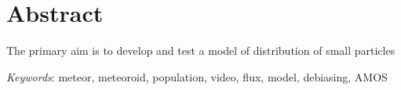 \section*{Abstract}
    The primary aim is to develop and test a model of distribution of small particles

    \emph{Keywords}: meteor, meteoroid, population, video, flux, model, debiasing, AMOS
